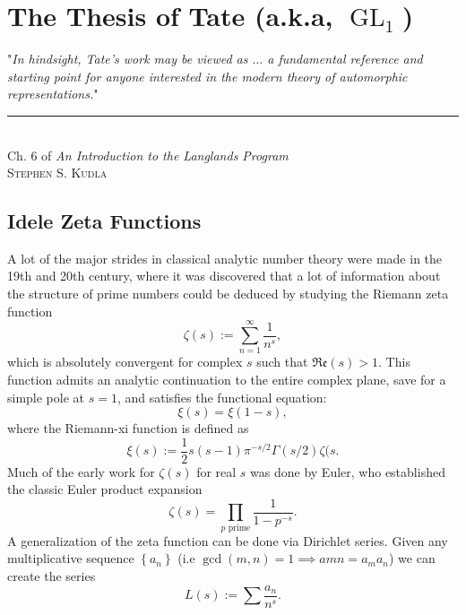 \documentclass[11pt, x11names, openany]{book}
\newcommand{\set}[1]{\left\{ #1 \right\}}
\newcommand{\re}[1]{\mathfrak{Re} \left( #1 \right)}
\DeclareMathOperator{\GL}{GL}
\newenvironment{myquote}[3]
{
    \begin{flushright}
    \begin{adjustwidth}{0.125\textwidth}{}
    "\textit{\small #1}"\\
    \end{adjustwidth}
    \rule{.75\linewidth}{0.5pt}\\
    #2\\ \textsc{#3}

}
{
    \end{flushright}
}
\begin{document}
\chapter{The Thesis of Tate (a.k.a, $\GL_1$)}
\label{chapter: Tate's thesis}

\begin{myquote}{In hindsight, Tate's work may be viewed as $\ldots$ a fundamental reference and starting point for anyone interested in the modern theory of automorphic representations.}{Ch. 6 of \textit{An Introduction to the Langlands Program}}{Stephen S. Kudla}

\end{myquote}


\section{Idele Zeta Functions}
\label{section: Id\'ele Zeta Functions}
A lot of the major strides in classical analytic number theory were made in the 19th and 20th century, where it was discovered that a lot of information about the structure of prime numbers could be deduced by studying the Riemann zeta function
\begin{equation*}
    \zeta(s) := \sum^\infty_{n=1} \frac{1}{n^s},
\end{equation*}
which is absolutely convergent for complex $s$ such that $\re{s} > 1$. This function admits an analytic continuation to the entire complex plane, save for a simple pole at $s=1$, and satisfies the functional equation:
\begin{equation*}
    \xi(s) = \xi(1-s),
\end{equation*}
where the Riemann-xi function is defined as
\begin{equation*}
    \xi(s) := \frac{1}{2}s(s-1)\pi^{-s/2} \Gamma(s/2) \zeta(s.
\end{equation*}
Much of the early work for $\zeta(s)$ for real $s$ was done by Euler, who established the classic Euler product expansion
\begin{equation*}
    \zeta(s) = \prod_{p \text{ prime}} \frac{1}{1-p^{-s}}.
\end{equation*}
A generalization of the zeta function can be done via Dirichlet series. Given any multiplicative sequence $\set{a_n}$ (i.e $\gcd(m, n) = 1 \implies a{mn} = a_ma_n$) we can create the series 
\begin{equation*}
    L(s) := \sum \frac{a_n}{n^s}.
\end{equation*}
\end{document}
